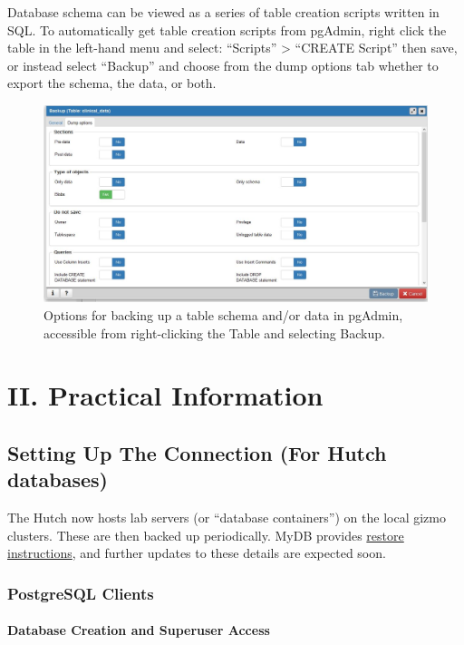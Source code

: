 \documentclass[]{article}
\let\oldparagraph\paragraph
\renewcommand{\paragraph}[1]{\oldparagraph{#1}\mbox{}}
\begin{document}
Database schema can be viewed as a series of table creation scripts
written in SQL. To automatically get table creation scripts from
pgAdmin, right click the table in the left-hand menu and select:
``Scripts'' \textgreater{} ``CREATE Script'' then save, or instead
select ``Backup'' and choose from the dump options tab whether to export
the schema, the data, or both.

\begin{figure}[htbp]
\centering
\includegraphics{backup_options.JPG}
\caption{Options for backing up a table schema and/or data in pgAdmin,
accessible from right-clicking the Table and selecting Backup.}
\end{figure}

\section{II. Practical Information}\label{ii.-practical-information-1}

\subsection{Setting Up The Connection (For Hutch
databases)}\label{setting-up-the-connection-for-hutch-databases}

The Hutch now hosts lab servers (or ``database containers'') on the
local gizmo clusters. These are then backed up periodically. MyDB
provides \href{https://mydb.fredhutch.org/doc_backup/}{restore
instructions}, and further updates to these details are expected soon.

\subsubsection{PostgreSQL Clients}\label{postgresql-clients}

\paragraph{Database Creation and Superuser
Access}\label{database-creation-and-superuser-access}
\end{document}
